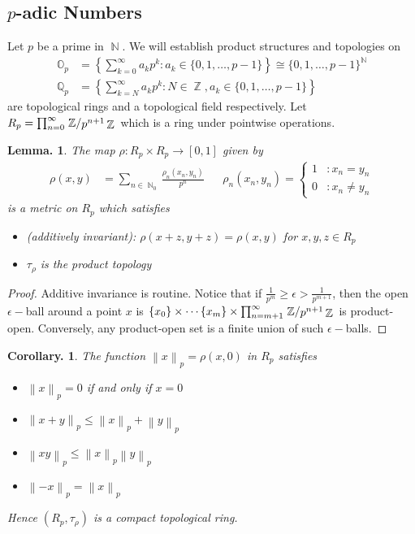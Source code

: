 \documentclass[11pt, a4paper]{memoir}
\DeclareMathOperator{\N}{{\mathbb{N}}}
\DeclareMathOperator{\Z}{{\mathbb{Z}}}
\newcommand{\norm}[1]{\ensuremath{\left\lVert#1\right\rVert}}
\theoremstyle{change}
\newtheorem{lemma}[theorem]{Lemma.}
\newtheorem{corollary}[theorem]{Corollary.}
\theoremstyle{plain}
\theoremstyle{nonumberplain}
\newtheorem{proof}{Proof}
\newcommand{\quot}[2]{\mathchoice{\left.\raisebox{0.14em}{$#1$}\middle/\raisebox{-0.14em}{$#2$}\right.}
                                 {\left.\raisebox{0.08em}{$#1$}\middle/\raisebox{-0.08em}{$#2$}\right.}
                                 {\left.\raisebox{0.03em}{$#1$}\middle/\raisebox{-0.03em}{$#2$}\right.}
                                 {\left.\raisebox{0em}{$#1$}\middle/\raisebox{0em}{$#2$}\right.}}
\newcommand{\defname}[1]{{\textit{(#1)}:}}
\numberwithin{equation}{section}
\begin{document}
\subsection{\texorpdfstring{$p$}{p}-adic Numbers}
Let $p$ be a prime in $\N$.
We will establish product structures and topologies on
\begin{align*}
    \mathbb{O}_p&=\left\{\sum_{k=0}^\infty a_kp^k:a_k\in\{0,1,\ldots,p-1\}\right\}\cong\{0,1,\ldots,p-1\}^{\N}\\
    \mathbb{Q}_p&=\left\{\sum_{k=N}^\infty a_kp^k:N\in\Z, a_k\in\{0,1,\ldots,p-1\}\right\}
\end{align*}
are topological rings and a topological field respectively.
Let $R_p=\prod_{n=0}^\infty\quot{\Z}{p^{n+1}\Z}$ which is a ring under pointwise operations.
\begin{lemma}
    The map $\rho:R_p\times R_p\to[0,1]$ given by
    \begin{align*}
        \rho(x,y)&=\sum_{n\in\N_0}\frac{\rho_n(x_n,y_n)}{p^n} & &\rho_n(x_n,y_n)=\begin{cases}1 &:x_n=y_n\\ 0 &:x_n\neq y_n\end{cases}
    \end{align*}
    is a metric on $R_p$ which satisfies
    \begin{itemize}[nl]
        \item \defname{additively invariant}
            $\rho(x+z,y+z)=\rho(x,y)$ for $x,y,z\in R_p$
        \item $\tau_\rho$ is the product topology
    \end{itemize}
\end{lemma}
\begin{proof}
    Additive invariance is routine.
    Notice that if $\frac{1}{p^m}\geq\epsilon>\frac{1}{p^{m+1}}$, then the open $\epsilon-$ball around a point $x$ is $\{x_0\}\times\cdots\{x_m\}\times\prod_{n=m+1}^\infty\quot{\Z}{p^{n+1}\Z}$ is product-open.
    Conversely, any product-open set is a finite union of such $\epsilon-$balls.
\end{proof}
\begin{corollary}
    The function $\norm{x}_p=\rho(x,0)$ in $R_p$ satisfies
    \begin{itemize}[nl]
        \item $\norm{x}_p=0$ if and only if $x=0$
        \item $\norm{x+y}_p\leq\norm{x}_p+\norm{y}_p$
        \item $\norm{xy}_p\leq\norm{x}_p\norm{y}_p$
        \item $\norm{-x}_p=\norm{x}_p$
    \end{itemize}
    Hence $(R_p,\tau_\rho)$ is a compact topological ring.
\end{corollary}
\end{document}
